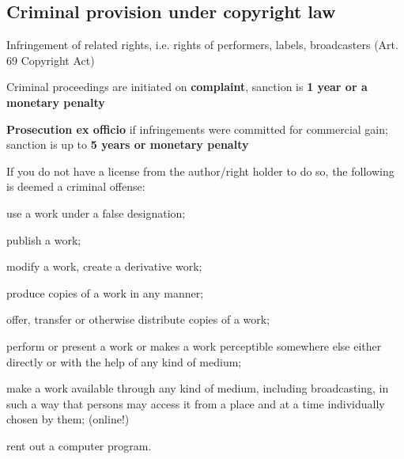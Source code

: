 \subsection{Criminal provision under copyright law}
\begin{compactitem}
	\item Infringement of related rights, i.e. rights of performers, labels, broadcasters (Art. 69 Copyright Act)
	\item Criminal proceedings are initiated on \textbf{complaint}, sanction is \textbf{1 year or a monetary penalty}
	\item \textbf{Prosecution ex officio} if infringements were committed for commercial gain; sanction is up to \textbf{5 years or monetary penalty}
\end{compactitem}
If you do not have a license from the author/right holder to do so, the following is deemed a criminal offense:
\begin{compactitem}
	\item use a work under a false designation;
	\item publish a work;
	\item modify a work, create a derivative work;
	\item produce copies of a work in any manner;
	\item offer, transfer or otherwise distribute copies of a work;
	\item perform or present a work or makes a work perceptible somewhere else either directly or with the help of any kind of medium;
	\item make a work available through any kind of medium, including broadcasting, in such a way that persons may access it from a place and at a time individually chosen by them; (online!)
	\item rent out a computer program.
\end{compactitem}

